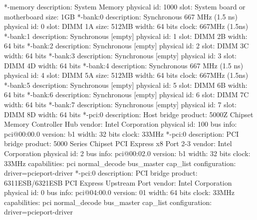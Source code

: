 \documentclass[mingoth,a4paper]{jsarticle}
\begin{document}
\begin{commandline}
     *-memory
          description: System Memory
          physical id: 1000
          slot: System board or motherboard
          size: 1GB
        *-bank:0
             description: Synchronous 667 MHz (1.5 ns)
             physical id: 0
             slot: DIMM 1A
             size: 512MB
             width: 64 bits
             clock: 667MHz (1.5ns)
        *-bank:1
             description: Synchronous [empty]
             physical id: 1
             slot: DIMM 2B
             width: 64 bits
        *-bank:2
             description: Synchronous [empty]
             physical id: 2
             slot: DIMM 3C
             width: 64 bits
        *-bank:3
             description: Synchronous [empty]
             physical id: 3
             slot: DIMM 4D
             width: 64 bits
        *-bank:4
             description: Synchronous 667 MHz (1.5 ns)
             physical id: 4
             slot: DIMM 5A
             size: 512MB
             width: 64 bits
             clock: 667MHz (1.5ns)
        *-bank:5
             description: Synchronous [empty]
             physical id: 5
             slot: DIMM 6B
             width: 64 bits
        *-bank:6
             description: Synchronous [empty]
             physical id: 6
             slot: DIMM 7C
             width: 64 bits
        *-bank:7
             description: Synchronous [empty]
             physical id: 7
             slot: DIMM 8D
             width: 64 bits
     *-pci:0
          description: Host bridge
          product: 5000Z Chipset Memory Controller Hub
          vendor: Intel Corporation
          physical id: 100
          bus info: pci@00:00.0
          version: b1
          width: 32 bits
          clock: 33MHz
        *-pci:0
             description: PCI bridge
             product: 5000 Series Chipset PCI Express x8 Port 2-3
             vendor: Intel Corporation
             physical id: 2
             bus info: pci@00:02.0
             version: b1
             width: 32 bits
             clock: 33MHz
             capabilities: pci normal_decode bus_master cap_list
             configuration: driver=pcieport-driver
           *-pci:0
                description: PCI bridge
                product: 6311ESB/6321ESB PCI Express Upstream Port
                vendor: Intel Corporation
                physical id: 0
                bus info: pci@04:00.0
                version: 01
                width: 64 bits
                clock: 33MHz
                capabilities: pci normal_decode bus_master cap_list
                configuration: driver=pcieport-driver

\end{commandline}
\end{document}
